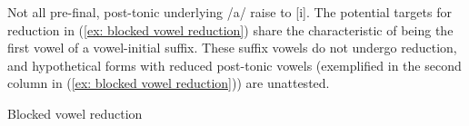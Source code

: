     \label{ex: post-tonic V reduction in incorporated verbsa}
        \label{ex: post-tonic V reduction in incorporated verbsb}
            \label{ex: post-tonic V reduction in incorporated verbsc}
                \label{ex: post-tonic V reduction in incorporated verbsd}
    \z
\z

Not all pre-final, post-tonic underlying /a/ raise to [i]. The potential targets for reduction in (\ref{ex: blocked vowel reduction}) share the characteristic of being the first vowel of a vowel-initial suffix. These suffix vowels do not undergo reduction, and hypothetical forms with reduced post-tonic vowels (exemplified in the second column in (\ref{ex: blocked vowel reduction})) are unattested.

\ea\label{ex: blocked vowel reduction}
{Blocked vowel reduction}

